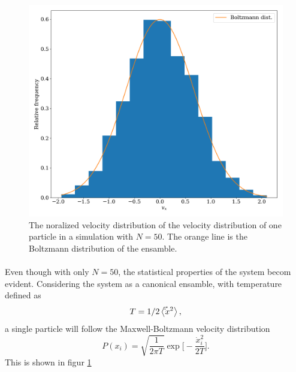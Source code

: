 \documentclass{article}
\begin{document}
        \begin{figure}
            
            \includegraphics[width = \textwidth]{vel_dist}
            \caption{The noralized velocity distribution of the velocity distribution of one particle in a simulation with $N = 50$. The orange line is the Boltzmann distribution of the ensamble.}
            \label{velocity dist}

        \end{figure}

        \paragraph*{}
        Even though with only $N=50$, the statistical properties of the system becom evident. Considering the system as a canonical ensamble, with temperature defined as
        \begin{equation*}
            T = 1/2 \expval{\vec \dot x^2},
        \end{equation*}
        a single particle will follow the Maxwell-Boltzmann velocity distribution
        \begin{equation*}
            P(x_i) = \sqrt{\frac{1}{2\pi T}}\exp \bigg[ -\frac{\dot x_i^2}{2T}\bigg].
        \end{equation*}
        This is shown in figur \ref{velocity dist}
\end{document}
